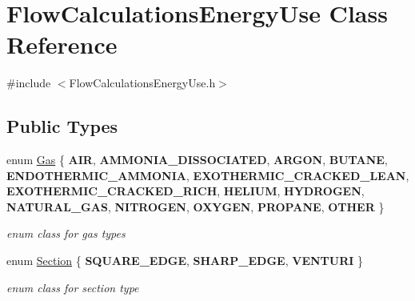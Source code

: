 \hypertarget{class_flow_calculations_energy_use}{}\section{Flow\+Calculations\+Energy\+Use Class Reference}
\label{class_flow_calculations_energy_use}


{\ttfamily \#include $<$Flow\+Calculations\+Energy\+Use.\+h$>$}

\subsection*{Public Types}
\begin{DoxyCompactItemize}
\item 
\mbox{\label{class_flow_calculations_energy_use_a840d5a836e7b05d6791b79bace4440f2}} 
enum \hyperlink{class_flow_calculations_energy_use_a840d5a836e7b05d6791b79bace4440f2}{Gas} \{ \newline
{\bfseries A\+IR}, 
{\bfseries A\+M\+M\+O\+N\+I\+A\+\_\+\+D\+I\+S\+S\+O\+C\+I\+A\+T\+ED}, 
{\bfseries A\+R\+G\+ON}, 
{\bfseries B\+U\+T\+A\+NE}, 
\newline
{\bfseries E\+N\+D\+O\+T\+H\+E\+R\+M\+I\+C\+\_\+\+A\+M\+M\+O\+N\+IA}, 
{\bfseries E\+X\+O\+T\+H\+E\+R\+M\+I\+C\+\_\+\+C\+R\+A\+C\+K\+E\+D\+\_\+\+L\+E\+AN}, 
{\bfseries E\+X\+O\+T\+H\+E\+R\+M\+I\+C\+\_\+\+C\+R\+A\+C\+K\+E\+D\+\_\+\+R\+I\+CH}, 
{\bfseries H\+E\+L\+I\+UM}, 
\newline
{\bfseries H\+Y\+D\+R\+O\+G\+EN}, 
{\bfseries N\+A\+T\+U\+R\+A\+L\+\_\+\+G\+AS}, 
{\bfseries N\+I\+T\+R\+O\+G\+EN}, 
{\bfseries O\+X\+Y\+G\+EN}, 
\newline
{\bfseries P\+R\+O\+P\+A\+NE}, 
{\bfseries O\+T\+H\+ER}
 \}\begin{DoxyCompactList}\small\item\em enum class for gas types \end{DoxyCompactList}
\item 
\mbox{\label{class_flow_calculations_energy_use_afbabab0da698748de91369a5dfc7662a}} 
enum \hyperlink{class_flow_calculations_energy_use_afbabab0da698748de91369a5dfc7662a}{Section} \{ {\bfseries S\+Q\+U\+A\+R\+E\+\_\+\+E\+D\+GE}, 
{\bfseries S\+H\+A\+R\+P\+\_\+\+E\+D\+GE}, 
{\bfseries V\+E\+N\+T\+U\+RI}
 \}\begin{DoxyCompactList}\small\item\em enum class for section type \end{DoxyCompactList}
\end{DoxyCompactItemize}
